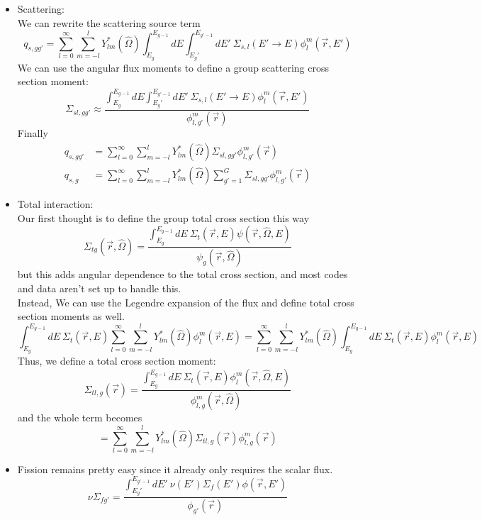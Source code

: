 \documentclass[12pt]{article}
\newcommand{\vOmega}{\ensuremath{\hat{\Omega}}}
\begin{document}
\begin{itemize}
\item Scattering:\\
We can rewrite the scattering source term
\[
q_{s,gg'} = \sum_{l=0}^{\infty} \sum_{m=-l}^l Y^*_{lm}(\vOmega)\int_{E_g}^{E_{g-1}} dE \int_{E_g'}^{E_{g'-1}} dE' \: \Sigma_{s,l}(E'\rightarrow E)\phi_{l}^{m}(\vec{r},E')
\]
We can use the angular flux moments to define a group scattering cross section moment:
\[
\Sigma_{sl,gg'} \approx \dfrac{\int_{E_g}^{E_{g-1}} dE \int_{E_g'}^{E_{g'-1}} dE' \: \Sigma_{s,l}(E'\rightarrow E)\phi_{l}^{m}(\vec{r},E')}{\phi_{l,g'}^{m}(\vec{r})}
\]
Finally
\begin{align*}
q_{s,gg'} &= \sum_{l=0}^{\infty} \sum_{m=-l}^l Y^*_{lm}(\vOmega)\Sigma_{sl,gg'}\phi_{l,g'}^{m}(\vec{r})\\
q_{s,g} &= \sum_{l=0}^{\infty} \sum_{m=-l}^l Y^*_{lm}(\vOmega)\sum_{g'=1}^G \Sigma_{sl,gg'}\phi_{l,g'}^{m}(\vec{r})
\end{align*}

\item Total interaction:\\
Our first thought is to define the group total cross section this way
\[
\Sigma_{tg}(\vec{r}, \vOmega) = \dfrac{\int_{E_g}^{E_{g-1}} dE\: \Sigma_t(\vec{r}, E) \psi(\vec{r}, \vOmega, E)}{\psi_g(\vec{r}, \vOmega)}
\]
but this adds angular dependence to the total cross section, and most codes and data aren't set up to handle this. \\
Instead, We can use the Legendre expansion of the flux and define total cross section moments as well.
\[
\int_{E_g}^{E_{g-1}} dE\: \Sigma_t(\vec{r}, E)\sum_{l=0}^{\infty} \sum_{m=-l}^l Y^*_{lm}(\vOmega)\phi_{l}^{m}(\vec{r},E) = \sum_{l=0}^{\infty} \sum_{m=-l}^l Y^*_{lm}(\vOmega)\int_{E_g}^{E_{g-1}} dE\: \Sigma_{t}(\vec{r},E)\phi_{l}^{m}(\vec{r},E)
\]
Thus, we define a total cross section moment:
\[
\Sigma_{tl,g}(\vec{r}) = \dfrac{\int_{E_g}^{E_{g-1}} dE\: \Sigma_t(\vec{r}, E) \phi_l^m(\vec{r}, \vOmega, E)}{\phi_{l,g}^m(\vec{r}, \vOmega)}
\]
and the whole term becomes
\[
= \sum_{l=0}^{\infty} \sum_{m=-l}^l Y^*_{lm}(\vOmega)\Sigma_{tl,g}(\vec{r})\phi_{l,g}^{m}(\vec{r})
\]

\item Fission remains pretty easy since it already only requires the scalar flux. 
\[
\nu\Sigma_{fg'} = \dfrac{\int_{E_g'}^{E_{g'-1}} dE'\: \nu(E') \Sigma_f(E')\phi(\vec{r}, E')}{\phi_{g'}(\vec{r})}
\]
\end{itemize}
\end{document}
